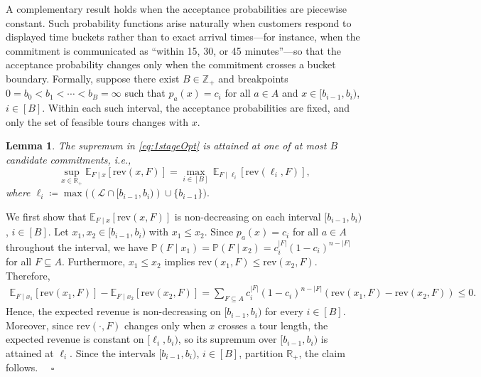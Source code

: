 \documentclass[11pt]{article}
\theoremstyle{plain}
\newtheorem{lemma}[theorem]{Lemma}
\theoremstyle{definition}
\renewenvironment{proof}[1]{\par\noindent{\itshape #1}\space\ignorespaces}{\par\medskip}
\newcommand{\Halmos}{\ensuremath{\quad\square}}
\begin{document}
	A complementary result holds when the acceptance probabilities are piecewise constant. Such probability functions arise naturally when customers respond to displayed time buckets rather than to exact arrival times---for instance, when the commitment is communicated as ``within 15, 30, or 45 minutes''---so that the acceptance probability changes only when the commitment crosses a bucket boundary. Formally, suppose there exist $B \in \mathbb{Z}_+$ and breakpoints $0 = b_0 < b_1 < \cdots < b_B = \infty$ such that $p_a(x) = c_i$ for all $a \in A$ and $x \in [b_{i-1}, b_i)$, $i \in [B]$. Within each such interval, the acceptance probabilities are fixed, and only the set of feasible tours changes with $x$.
	
	\begin{lemma} \label{lemma:discretisation_prob}
		The supremum in \eqref{eq:1stageOpt} is attained at one of at most $B$ candidate commitments, i.e.,
		\[
			\sup_{x \in \mathbb{R}_+} \mathbb{E}_{F\mid x}\left[ \text{rev}(x, F) \right] = \max_{i \in [B]} \, \mathbb{E}_{F\mid \ell_i}\left[ \text{rev}(\ell_i, F) \right],
		\]
		 where \(\ell_i \coloneqq \max\bigl(\left(\mathcal{L} \cap [b_{i-1}, b_i)\right) \cup \{b_{i-1}\}\bigr).\)
	\end{lemma}
	\begin{proof}{Proof.}
		We first show that $\mathbb{E}_{F\mid x}\left[ \text{rev}(x, F) \right]$ is non-decreasing on each interval $[b_{i-1}, b_i)$, $i \in [B]$. Let $x_1, x_2 \in [b_{i-1}, b_i)$ with $x_1 \leq x_2$. Since $p_a(x) = c_i$ for all $a \in A$ throughout the interval, we have $\mathbb{P}(F \mid x_1) = \mathbb{P}(F \mid x_2) = c_i^{|F|}(1-c_i)^{n-|F|}$ for all $F \subseteq A$. Furthermore, $x_1 \leq x_2$ implies $\text{rev}(x_1, F) \leq \text{rev}(x_2, F)$. Therefore,
		\begin{align*}
			\mathbb{E}_{F\mid x_1}\left[ \text{rev}(x_1, F) \right] - \mathbb{E}_{F\mid x_2}\left[\text{rev}(x_2, F) \right] 
			= \sum_{F \subseteq A} c_i^{|F|}(1-c_i)^{n-|F|} \left(\text{rev}(x_1, F) - \text{rev}(x_2, F)\right)
			\leq 0.
		\end{align*}
		Hence, the expected revenue is non-decreasing on $[b_{i-1}, b_i)$ for every $i \in [B]$. Moreover, since $\text{rev}(\cdot, F)$ changes only when $x$ crosses a tour length, the expected revenue is constant on $[\ell_i, b_i)$, so its supremum over $[b_{i-1}, b_i)$ is attained at $\ell_i$. Since the intervals $[b_{i-1}, b_i)$, $i \in [B]$, partition $\mathbb{R}_+$, the claim follows.
	\Halmos
\end{proof}
\end{document}

